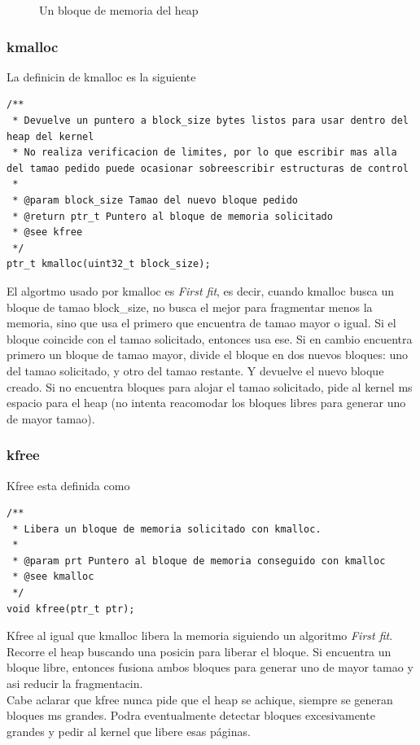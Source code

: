 \begin{figure}[H]
\centering
{}
\caption{Un bloque de memoria del heap}
\end{figure}

\subsubsection{ kmalloc }
La definicin de kmalloc es la siguiente

\begin{verbatim}
/**
 * Devuelve un puntero a block_size bytes listos para usar dentro del heap del kernel
 * No realiza verificacion de limites, por lo que escribir mas alla del tamao pedido puede ocasionar sobreescribir estructuras de control
 *
 * @param block_size Tamao del nuevo bloque pedido
 * @return ptr_t Puntero al bloque de memoria solicitado
 * @see kfree
 */
ptr_t kmalloc(uint32_t block_size);
\end{verbatim}

El algortmo usado por kmalloc es \textit{First fit}, es decir, cuando kmalloc busca un bloque de tamao block\_size, no busca el mejor para fragmentar menos la memoria, sino que usa el primero que encuentra de tamao mayor o igual. Si el bloque coincide con el tamao solicitado, entonces usa ese. Si en cambio encuentra primero un bloque de tamao mayor, divide el bloque en dos nuevos bloques: uno del tamao solicitado, y otro del tamao restante. Y devuelve el nuevo bloque creado. Si no encuentra bloques para alojar el tamao solicitado, pide al kernel ms espacio para el heap (no intenta reacomodar los bloques libres para generar uno de mayor tamao).

\subsubsection{ kfree }
Kfree esta definida como
\begin{verbatim}
/**
 * Libera un bloque de memoria solicitado con kmalloc.
 *
 * @param prt Puntero al bloque de memoria conseguido con kmalloc
 * @see kmalloc
 */
void kfree(ptr_t ptr);
\end{verbatim}

Kfree al igual que kmalloc libera la memoria siguiendo un algoritmo \textit{First fit}. Recorre el heap buscando una posicin para liberar el bloque. Si encuentra un bloque libre, entonces fusiona ambos bloques para generar uno de mayor tamao y asi reducir la fragmentacin.\\
Cabe aclarar que kfree nunca pide que el heap se achique, siempre se generan bloques ms grandes. Podra eventualmente detectar bloques excesivamente grandes 
y pedir al kernel que libere esas páginas.

